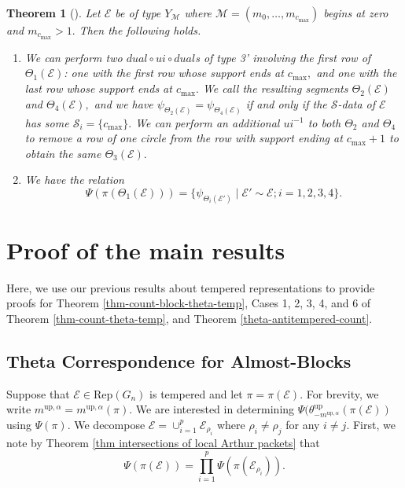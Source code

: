 \documentclass[11pt,letterpaper]{amsart}
\newcommand{\Rep}{{\mathrm{Rep}}}
\newcommand{\up}{{\mathrm{up}}}
\newcommand{\EE}{\mathcal{E}}
\newtheorem{thm}{Theorem}[section]
\numberwithin{equation}{section}
\begin{document}
\begin{thm}[{\cite[Theorem 6.5]{HKT26}}]
\label{first block m_n > 1}
    Let $\EE$ be of type $Y_\mathcal{M}$ where $\mathcal{M} = (m_0, \dots, m_{c_{\max}})$ begins at zero and $m_{c_{\max}} > 1.$
    Then the following holds.
    \begin{enumerate}
        \item We can perform two $dual \circ ui \circ dual$s of type 3' involving the first row of $\Theta_1(\mathcal{E})$: one with the first row whose support ends at $c_{\max},$ and one with the last row whose support ends at $c_{\max}.$ We call the resulting segments $\Theta_2(\mathcal{E})$ and $\Theta_4(\mathcal{E}),$ and we have $\psi_{\Theta_2(\mathcal{E})} = \psi_{\Theta_4(\mathcal{E})}$ if and only if the $\mathcal{S}$-data of $\EE$ has some $\mathcal{S}_i = \{c_{\max}\}.$ We can perform an additional $ui^{-1}$ to both $\Theta_2$ and $\Theta_4$ to remove a row of one circle from the row with support ending at $c_{\max} + 1$ to obtain the same $\Theta_3(\EE).$
        \item We have the relation $$\Psi(\pi(\Theta_1(\EE))) = \{\psi_{\Theta_i(\EE')} \mid \mathcal{E}' \sim \mathcal{E}; i = 1, 2, 3, 4 \}.$$
    \end{enumerate}
\end{thm}


\section{Proof of the main results}\label{sec theta results}



Here, we use our previous results about tempered representations to provide proofs for Theorem \ref{thm-count-block-theta-temp}, Cases 1, 2, 3, 4, and 6 of Theorem \ref{thm-count-theta-temp}, and Theorem \ref{theta-antitempered-count}.

\subsection{Theta Correspondence for Almost-Blocks}\label{sec Theta Correspondence for Almost-Blocks}

Suppose that $\EE\in\Rep(G_n)$ is tempered and let $\pi=\pi(\EE)$. For brevity, we write $m^{\up, \alpha}=m^{\up, \alpha}(\pi).$ We are interested in determining $\Psi(\theta_{-m^{\up, \alpha}}^\up(\pi(\mathcal{E}))$ using $\Psi(\pi).$ We decompose $\EE=\cup_{i=1}^p\EE_{\rho_i}$ where $\rho_i\neq\rho_j$ for any $i\neq j.$  First, we note by Theorem \ref{thm intersections of local Arthur packets} that 
\[
\Psi(\pi(\EE))=\prod_{i=1}^p\Psi(\pi(\EE_{\rho_i})).
\]
\end{document}
